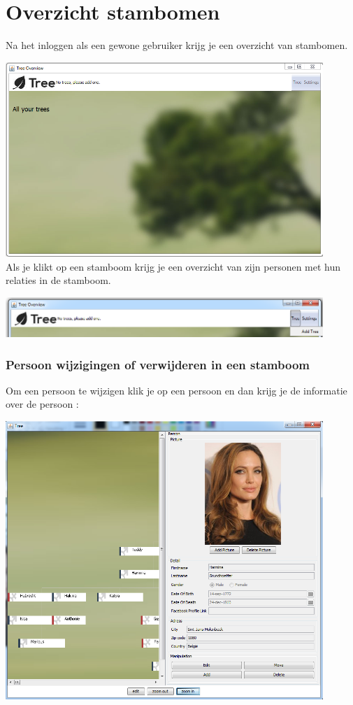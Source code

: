 \documentclass[pdftex,a4paper,12pt,twoside]{report}
\begin{document}
\chapter{Overzicht stambomen}\label{ch:preface}

Na het inloggen als een gewone gebruiker krijg je een overzicht van stambomen.

\includegraphics[width=12cm]{images/user_treeoverview.png}\\[.5cm]

Als je klikt op een stamboom krijg je een overzicht van zijn personen met hun relaties in de stamboom.

\includegraphics[width=12cm]{images/tree_add.png}\\[.5cm]

\subsection{Persoon wijzigingen of verwijderen in een stamboom }
Om een persoon te wijzigen klik je op een persoon en dan krijg je de informatie over de persoon :

\includegraphics[width=12cm]{images/tree_person.png}\\[.5cm]
\end{document}
